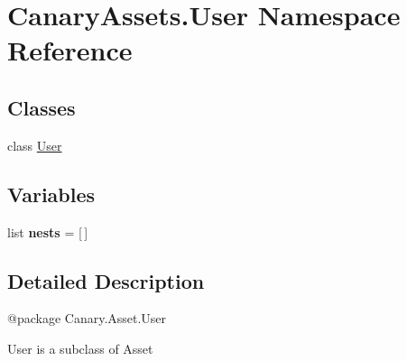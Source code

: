 \hypertarget{namespace_canary_assets_1_1_user}{\section{Canary\-Assets.\-User Namespace Reference}
\label{namespace_canary_assets_1_1_user}
}
\subsection*{Classes}
\begin{DoxyCompactItemize}
\item 
class \hyperlink{class_canary_assets_1_1_user_1_1_user}{User}
\end{DoxyCompactItemize}
\subsection*{Variables}
\begin{DoxyCompactItemize}
\item 
\hypertarget{namespace_canary_assets_1_1_user_a663486349c21a6ce89e2418d32bd95a5}{list {\bfseries nests} = \mbox{[}$\,$\mbox{]}}\label{namespace_canary_assets_1_1_user_a663486349c21a6ce89e2418d32bd95a5}

\end{DoxyCompactItemize}


\subsection{Detailed Description}
\begin{DoxyVerb}@package Canary.Asset.User

User is a subclass of Asset
\end{DoxyVerb}
 